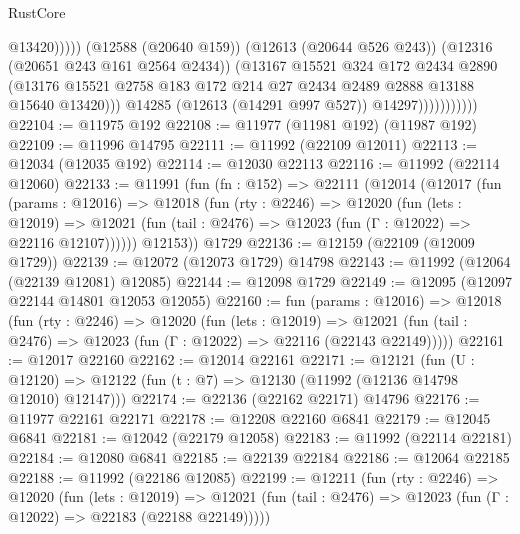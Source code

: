 \begin{lexlean}{RustCore}
\begin{coremodule}
                                      @13420)))))
                            (@12588 (@20640 @159))
                            (@12613 (@20644 @526 @243))
                            (@12316 (@20651 @243 @161 @2564 @2434))
                            (@13167
                              @15521
                              @324
                              @172
                              @2434
                              @2890
                              (@13176
                                @15521
                                @2758
                                @183
                                @172
                                @214
                                @27
                                @2434
                                @2489
                                @2888
                                @13188
                                @15640
                                @13420)))
                          @14285
                          (@12613 (@14291 @997 @527))
                          @14297)))))))))))
@22104 := @11975 @192
@22108 := @11977 (@11981 @192) (@11987 @192)
@22109 := @11996 @14795
@22111 := @11992 (@22109 @12011)
@22113 := @12034 (@12035 @192)
@22114 := @12030 @22113
@22116 := @11992 (@22114 @12060)
@22133 := @11991
    (fun (fn : @152) =>
    @22111
      (@12014
        (@12017
          (fun (params : @12016) =>
          @12018
            (fun (rty : @2246) =>
            @12020
              (fun (lets : @12019) =>
              @12021 (fun (tail : @2476) => @12023 (fun (Γ : @12022) => @22116 @12107))))))
        @12153))
    @1729
@22136 := @12159 (@22109 (@12009 @1729))
@22139 := @12072 (@12073 @1729) @14798
@22143 := @11992 (@12064 (@22139 @12081) @12085)
@22144 := @12098 @1729
@22149 := @12095 (@12097 @22144 @14801 @12053 @12055)
@22160 := fun (params : @12016) =>
  @12018
    (fun (rty : @2246) =>
    @12020
      (fun (lets : @12019) =>
      @12021 (fun (tail : @2476) => @12023 (fun (Γ : @12022) => @22116 (@22143 @22149)))))
@22161 := @12017 @22160
@22162 := @12014 @22161
@22171 := @12121
    (fun (U : @12120) => @12122 (fun (t : @7) => @12130 (@11992 (@12136 @14798 @12010) @12147)))
@22174 := @22136 (@22162 @22171) @14796
@22176 := @11977 @22161 @22171
@22178 := @12208 @22160 @6841
@22179 := @12045 @6841
@22181 := @12042 (@22179 @12058)
@22183 := @11992 (@22114 @22181)
@22184 := @12080 @6841
@22185 := @22139 @22184
@22186 := @12064 @22185
@22188 := @11992 (@22186 @12085)
@22199 := @12211
    (fun (rty : @2246) =>
    @12020
      (fun (lets : @12019) =>
      @12021 (fun (tail : @2476) => @12023 (fun (Γ : @12022) => @22183 (@22188 @22149)))))

\end{coremodule}
\end{lexlean}

